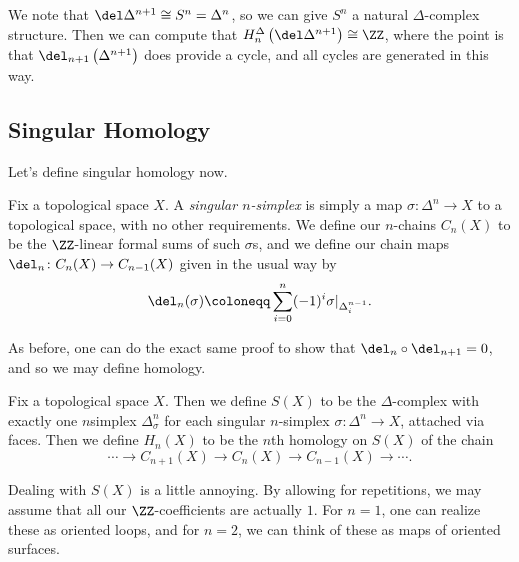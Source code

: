\documentclass[../notes.tex]{subfiles}
\begin{document}
\begin{example}
	We note that $\del\Delta^{n+1}\cong S^n=\Delta^n$, so we can give $S^n$ a natural $\Delta$-complex structure. Then we can compute that $H_n^\Delta\left(\del\Delta^{n+1}\right)\cong\ZZ$, where the point is that $\del_{n+1}\left(\Delta^{n+1}\right)$ does provide a cycle, and all cycles are generated in this way.
\end{example}

\subsection{Singular Homology}
Let's define singular homology now.
\begin{definition}
	Fix a topological space $X$. A \textit{singular $n$-simplex} is simply a map $\sigma\colon\Delta^n\to X$ to a topological space, with no other requirements. We define our $n$-chains $C_n(X)$ to be the $\ZZ$-linear formal sums of such $\sigma$s, and we define our chain maps $\del_n\colon C_n(X)\to C_{n-1}(X)$ given in the usual way by
	\[\del_n(\sigma)\coloneqq\sum_{i=0}^n(-1)^i\sigma|_{\Delta_i^{n-1}}.\]
\end{definition}
As before, one can do the exact same proof to show that $\del_n\circ\del_{n+1}=0$, and so we may define homology.
\begin{definition}
	Fix a topological space $X$. Then we define $S(X)$ to be the $\Delta$-complex with exactly one $n$simplex $\Delta^n_\sigma$ for each singular $n$-simplex $\sigma\colon\Delta^n\to X$, attached via faces. Then we define $H_n(X)$ to be the $n$th homology on $S(X)$ of the chain
	\[\cdots\to C_{n+1}(X)\to C_n(X)\to C_{n-1}(X)\to\cdots.\]
\end{definition}
Dealing with $S(X)$ is a little annoying. By allowing for repetitions, we may assume that all our $\ZZ$-coefficients are actually $1$. For $n=1$, one can realize these as oriented loops, and for $n=2$, we can think of these as maps of oriented surfaces.
\end{document}
